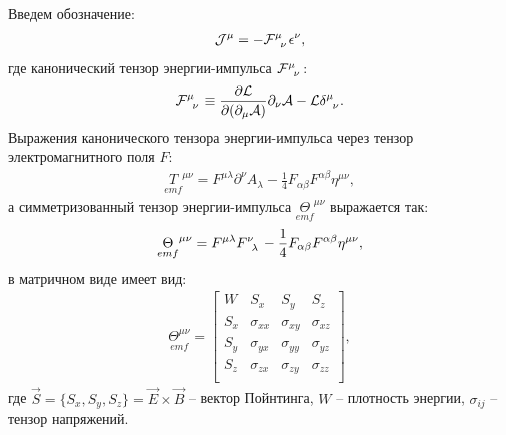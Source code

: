 \documentclass[__main__.tex]{subfiles}
\begin{document}
Введем обозначение:
\begin{gather}
    \mathcal{J}^\mu=-\mathcal{F}\indices{^\mu_\nu}\epsilon^\nu,
\end{gather}
где канонический тензор энергии-импульса $\mathcal{F}\indices{^\mu_\nu}$:
\begin{gather}
    \mathcal{F}\indices{^\mu_\nu}\equiv\frac{\partial \mathcal{L}}{\partial (\partial_\mu \mathcal{A})}\partial_\nu\mathcal{A}-\mathcal{L}\delta\indices{^\mu_\nu}.
\end{gather}
Выражения канонического тензора энергии-импульса через тензор электромагнитного поля $F$:
\begin{gather*}
    \underset{emf}{T}^{\mu\nu} = F^{\mu\lambda}\partial^\nu A_\lambda - \frac{1}{4}F_{\alpha\beta}F^{\alpha\beta}\eta^{\mu\nu},
\end{gather*}
а симметризованный тензор энергии-импульса $\underset{emf}{\Theta}^{\mu\nu}$ выражается так:
\begin{gather*}
    \underset{emf}{\Theta}^{\mu\nu}
    =
    F^{\mu\lambda}F\indices{^\nu_\lambda}
    -
    \frac{1}{4}F_{\alpha\beta}F^{\alpha\beta}\eta^{\mu\nu},
\end{gather*}
в матричном виде имеет вид:
\begin{gather*}
\underset{emf}{\Theta^{\mu\nu}} =
\left[
\begin{array}{cccc}
W & S_x & S_y & S_z \\
S_x & \sigma_{xx} & \sigma_{xy} & \sigma_{xz} \\
S_y & \sigma_{yx} & \sigma_{yy} & \sigma_{yz} \\
S_z & \sigma_{zx} & \sigma_{zy} & \sigma_{zz} \\
\end{array}
\right],
\end{gather*}
где $\vec{S}=\{S_x,S_y,S_z\}=\vec{E}\times\vec{B}$ -- вектор Пойнтинга, $W$ -- плотность энергии, $\sigma_{ij}$ -- тензор напряжений.
\end{document}
